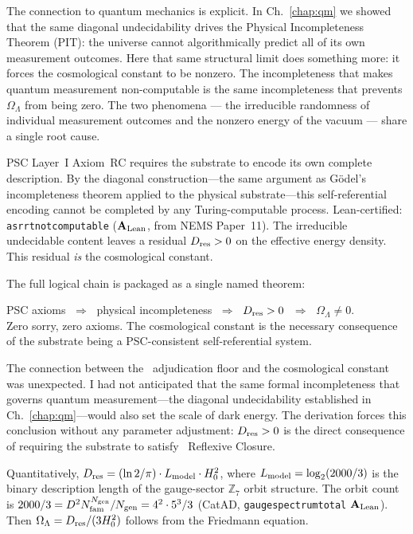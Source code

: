 \documentclass[11pt,openany]{book}
\theoremstyle{remark}
\newcommand{\PSC}{\text{PSC}}
\newcommand{\ZS}{\mathbb{Z}_7}
\newcommand{\lean}[1]{%
  \penalty-100
  \begingroup\def\_{\textunderscore\allowbreak}\texttt{#1}\endgroup}
\newcommand{\OmL}{\Omega_\Lambda}
\newcommand{\Dres}{D_{\rm res}}
\newcommand{\Lmodel}{L_{\rm model}}
\newcommand{\CatAL}{\ensuremath{\textbf{A}_{\rm Lean}}}
\begin{document}
The connection to quantum mechanics is explicit.  In Ch.~\ref{chap:qm} we showed that
the same diagonal undecidability drives the Physical Incompleteness Theorem (PIT):
the universe cannot algorithmically predict all of its own measurement outcomes.
Here that same structural limit does something more: it forces the cosmological
constant to be nonzero.  The incompleteness that makes quantum measurement
non-computable is the same incompleteness that prevents $\OmL$ from being zero.
The two phenomena --- the irreducible randomness of individual measurement outcomes
and the nonzero energy of the vacuum --- share a single root cause.

PSC Layer~I Axiom~RC requires the substrate to encode its own complete description.
By the diagonal construction---the same argument as G\"{o}del's incompleteness theorem
applied to the physical substrate---this self-referential encoding cannot be completed
by any Turing-computable process.
Lean-certified: \lean{asr\_rt\_not\_computable} (\CatAL, from NEMS Paper~11).
The irreducible undecidable content leaves a residual $\Dres > 0$ on the effective
energy density.
This residual \emph{is} the cosmological constant.

The full logical chain is packaged as a single named theorem:

\begin{tcolorbox}[colback=orange!5,colframe=orange!60,
  title={Theorem: The PSC-Adjudication Theorem (\CatAL)}]
  PSC axioms $\;\Rightarrow\;$ physical incompleteness
  $\;\Rightarrow\;$ $\Dres > 0$
  $\;\Rightarrow\;$ $\OmL \neq 0$.\\[4pt]
  Zero sorry, zero axioms.
  The cosmological constant is the necessary consequence of the substrate being
  a PSC-consistent self-referential system.
\end{tcolorbox}

The connection between the \PSC\ adjudication floor and the cosmological constant
was unexpected.  I had not anticipated that the same formal incompleteness that governs
quantum measurement---the diagonal undecidability established in Ch.~\ref{chap:qm}---would
also set the scale of dark energy.  The derivation forces this conclusion without any
parameter adjustment: $\Dres > 0$ is the direct consequence of requiring the substrate
to satisfy \PSC\ Reflexive Closure.

Quantitatively, $\Dres = (\ln 2/\pi) \cdot \Lmodel \cdot H_0^2$, where
$\Lmodel = \log_2(2000/3)$ is the binary description length of the gauge-sector $\ZS$
orbit structure.
The orbit count is $2000/3 = D^2 N_{\rm fam}^{N_{\rm gen}} / N_{\rm gen} = 4^2 \cdot 5^3/3$
(CatAD, \lean{gauge\_spectrum\_total} \CatAL).
Then $\OmL = \Dres/(3H_0^2)$ follows from the Friedmann equation.
\end{document}
